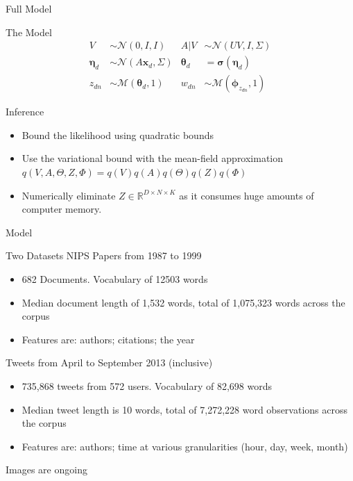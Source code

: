 \documentclass[xcolor=dvipsnames]{beamer}
\newcommand \vv[1] { \boldsymbol #1 }
\newcommand \thd[0]  { { \vv \theta_d } }
\newcommand \xd      { { \vv x_d } }
\newcommand \nor[2]   { \mathcal{N} \left( {#1}, {#2} \right) }
\newcommand \mnor[3]  { \mathcal{N} \left(#1, #2, #3\right) }
\newcommand \muln[2]  { \mathcal{M} \left( {#1},{#2} \right) }
\begin{document}
\begin{frame}{Full Model}

The Model
\begin{align}
V &\sim \mnor{0}{I}{I} & A|V & \sim \mnor{UV}{I}{\Sigma} \\
\vv{\eta}_d & \sim \nor{A\xd}{\Sigma} & \thd & = \vv{\sigma}(\vv{\eta}_d) \\
z_{dn} & \sim \muln{\thd}{1} & w_{dn} & \sim \muln{\vv{\phi}_{z_{dn}}}{1} 
\end{align}

\bigskip
Inference
\begin{itemize}
    \item Bound the likelihood using quadratic bounds
    \item Use the variational bound with the mean-field approximation $q(V, A, \Theta, Z, \Phi) = q(V)q(A)q(\Theta)q(Z)q(\Phi)$
    \item Numerically eliminate $Z \in \mathbb{R}^{D\times N \times K}$ as it consumes huge amounts of computer memory.
\end{itemize}

\end{frame}


\begin{frame}{Model}

Two Datasets
NIPS Papers from 1987 to 1999
\begin{itemize}
    \item 682 Documents. Vocabulary of 12503 words
    \item Median document length of 1,532 words, total of 1,075,323 words across the corpus
    \item Features are: authors; citations; {\color{gray} the year}
\end{itemize}

Tweets from April to September 2013 (inclusive)
\begin{itemize}
    \item 735,868 tweets from 572 users. Vocabulary of 82,698 words
    \item Median tweet length is 10 words, total of 7,272,228 word observations across the corpus 
    \item Features are: authors; time at various granularities (hour, day, week, month)
\end{itemize}

Images are ongoing

\end{frame}
\end{document}

